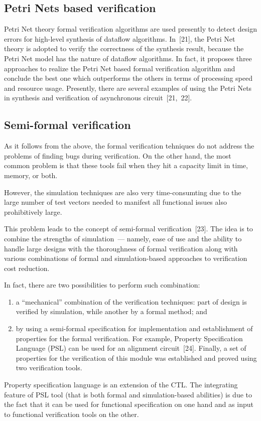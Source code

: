 \begin{multicols}{2}
\subsection{Petri Nets based verification} %

  \noindent
Petri Net theory formal verification algorithms are used presently to detect design errors for high-level
synthesis of dataflow algorithms. In~[21], the Petri Net theory is adopted to verify the correctness of
the synthesis result, because the Petri Net model has the nature of dataflow algorithms. In fact, it proposes
three approaches to realize the Petri Net based formal verification algorithm and conclude the best one which
outperforms the others in terms of processing speed and resource usage. Presently,
there are several examples of
using the Petri Nets in synthesis and verification of asynchronous circuit~[21,~22].

\subsection{Semi-formal verification} %

   \noindent
As it follows from the above, the formal verification  tehniques do not address the problems of finding bugs
during verification. On the other hand, the most common problem is that these tools fail when they hit a
capacity limit in time, memory, or both.

   However, the simulation techniques are also very time-consumting due to the large number of test vectors
needed to manifest all functional issues also prohibitively large.

This problem leads to the concept of semi-formal verification~[23]. The idea is to combine the
strengths of simulation~--- namely, ease of use and the ability to handle large designs with the thoroughness of
formal verification along with various combinations of formal and simulation-based approaches to verification
cost reduction.

    In fact, there are two possibilities to perform such combination:
    \begin{enumerate}[(1)]
\item a ``mechanical'' combination of the verification techniques: part of design is verified by simulation,
while another by a formal method; and
\item by using a semi-formal specification for implementation and establishment of properties for the
formal verification. For example, Property Specification Language (PSL) can be used for an alignment
circuit~[24]. Finally, a set of properties for the veri\-fi\-cation of this module was established and
proved using two verification tools.
    \end{enumerate}
    Property specification language is an extension of the CTL.
The integrating feature of PSL tool (that is both formal and simulation-based
abilities) is due to the fact that it can be used for functional specification on one hand and as input to
functional verification tools on the other.


\end{multicols}

